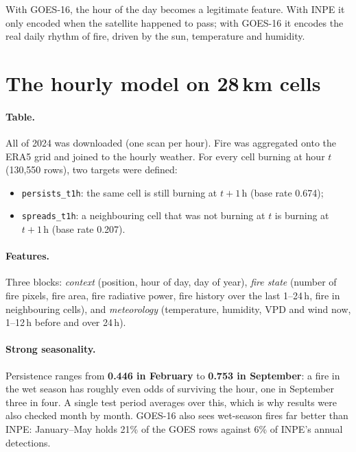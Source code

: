 \documentclass[11pt,a4paper,oneside]{report}
\newcommand{\code}[1]{\texttt{\small #1}}
\begin{document}
\begin{plainbox}
With GOES-16, the hour of the day becomes a legitimate feature. With INPE it only
encoded when the satellite happened to pass; with GOES-16 it encodes the real
daily rhythm of fire, driven by the sun, temperature and humidity.
\end{plainbox}

\section{The hourly model on 28\,km cells}

\paragraph{Table.} All of 2024 was downloaded (one scan per hour). Fire was
aggregated onto the ERA5 grid and joined to the hourly weather. For every cell
burning at hour $t$ (130{,}550 rows), two targets were defined:
\begin{itemize}
  \item \code{persists\_t1h}: the same cell is still burning at $t+1$\,h (base
        rate 0.674);
  \item \code{spreads\_t1h}: a neighbouring cell that was not burning at $t$ is
        burning at $t+1$\,h (base rate 0.207).
\end{itemize}

\paragraph{Features.} Three blocks: \emph{context} (position, hour of day, day of
year), \emph{fire state} (number of fire pixels, fire area, fire radiative power,
fire history over the last 1--24\,h, fire in neighbouring cells), and
\emph{meteorology} (temperature, humidity, VPD and wind now, 1--12\,h before and
over 24\,h).

\paragraph{Strong seasonality.} Persistence ranges from \textbf{0.446 in
February} to \textbf{0.753 in September}: a fire in the wet season has roughly
even odds of surviving the hour, one in September three in four. A single test
period averages over this, which is why results were also checked month by month.
GOES-16 also sees wet-season fires far better than INPE: January--May holds 21\%
of the GOES rows against 6\% of INPE's annual detections.
\end{document}
